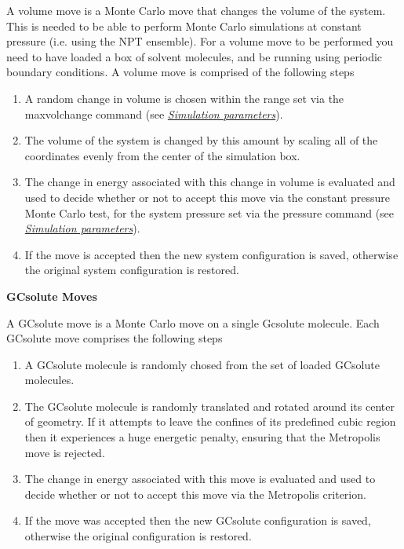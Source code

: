 \documentclass[letterpaper,10pt,english]{sphinxmanual}
\begin{document}
A volume move is a Monte Carlo move that changes the volume of the system. This is needed to be able to perform Monte Carlo simulations at constant pressure (i.e. using the NPT ensemble). For a volume move to be performed you need to have loaded a box of solvent molecules, and be running using periodic boundary conditions. A volume move is comprised of the following steps
\begin{enumerate}
\item {} 
A random change in volume is chosen within the range set via the maxvolchange command (see {\hyperref[protoms:parameters]{\emph{Simulation parameters}}}).

\item {} 
The volume of the system is changed by this amount by scaling all of the coordinates evenly from the center of the simulation box.

\item {} 
The change in energy associated with this change in volume is evaluated and used to decide whether or not to accept this move via the constant pressure Monte Carlo test, for the system pressure set via the pressure command (see {\hyperref[protoms:parameters]{\emph{Simulation parameters}}}).

\item {} 
If the move is accepted then the new system configuration is saved, otherwise the original system configuration is restored.

\end{enumerate}

\textbf{GCsolute Moves}

A GCsolute move is a Monte Carlo move on a single Gcsolute molecule. Each GCsolute move comprises the following steps
\begin{enumerate}
\item {} 
A GCsolute molecule is randomly chosed from the set of loaded GCsolute molecules.

\item {} 
The GCsolute molecule is randomly translated and rotated around its center of geometry. If it attempts to leave the confines of its predefined cubic region then it experiences a huge energetic penalty, ensuring that the Metropolis move is rejected.

\item {} 
The change in energy associated with this move is evaluated and used to decide whether or not to accept this move via the Metropolis criterion.

\item {} 
If the move was accepted then the new GCsolute configuration is saved, otherwise the original configuration is restored.

\end{enumerate}
\end{document}
